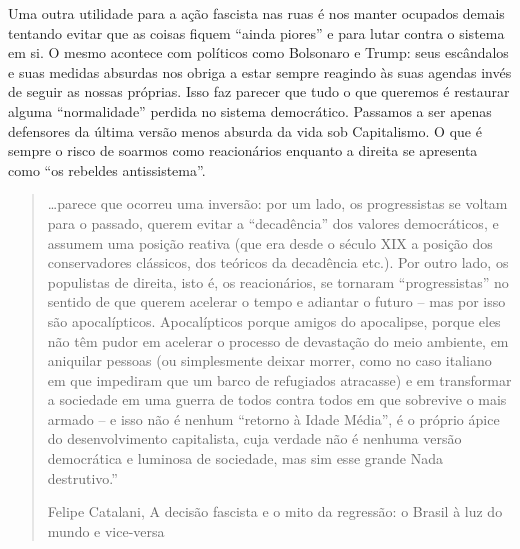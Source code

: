 Uma outra utilidade para a ação fascista nas ruas é nos manter ocupados demais tentando evitar que as coisas fiquem “ainda piores” e para lutar contra o sistema em si. O mesmo acontece com políticos como Bolsonaro e Trump: seus escândalos e suas medidas absurdas nos obriga a estar sempre reagindo às suas agendas invés de seguir as nossas próprias. Isso faz parecer que tudo o que queremos é restaurar alguma “normalidade” perdida no sistema democrático. Passamos a ser apenas defensores da última versão menos absurda da vida sob Capitalismo. O que é sempre o risco de soarmos como reacionários enquanto a direita se apresenta como “os rebeldes antissistema”.

\begin{quote}
…parece que ocorreu uma inversão: por um lado, os progressistas se voltam para o passado, querem evitar a “decadência” dos valores democráticos, e assumem uma posição reativa (que era desde o século XIX a posição dos conservadores clássicos, dos teóricos da decadência etc.). Por outro lado, os populistas de direita, isto é, os reacionários, se tornaram “progressistas” no sentido de que querem acelerar o tempo e adiantar o futuro – mas por isso são apocalípticos. Apocalípticos porque amigos do apocalipse, porque eles não têm pudor em acelerar o processo de devastação do meio ambiente, em aniquilar pessoas (ou simplesmente deixar morrer, como no caso italiano em que impediram que um barco de refugiados atracasse) e em transformar a sociedade em uma guerra de todos contra todos em que sobrevive o mais armado – e isso não é nenhum “retorno à Idade Média”, é o próprio ápice do desenvolvimento capitalista, cuja verdade não é nenhuma versão democrática e luminosa de sociedade, mas sim esse grande Nada destrutivo.”

Felipe Catalani, A decisão fascista e o mito da regressão: o Brasil à luz do mundo e vice-versa
\end{quote}

